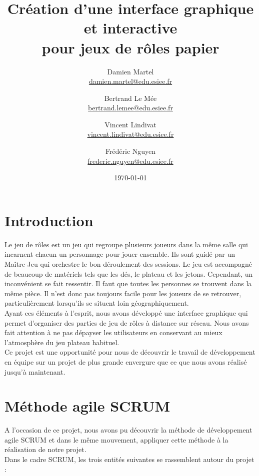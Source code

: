 \documentclass[11pt]{article}
\title{Création d'une interface graphique et interactive \\ pour jeux de rôles papier}
\author{
	Damien Martel \\ \href{mailto:damien.martel@edue.esiee.fr}{damien.martel@edu.esiee.fr} \and
	Bertrand Le Mée \\ \href{mailto:bertrand.lemee@edu.esiee.fr}{bertrand.lemee@edu.esiee.fr} \and
	Vincent Lindivat \\ \href{mailto:vincent.lindivat@edu.esiee.fr}{vincent.lindivat@edu.esiee.fr} \and
	Frédéric Nguyen \\ \href{mailto:frederic.nguyen@edu.esiee.fr}{frederic.nguyen@edu.esiee.fr}
}
\date{\today}
\begin{document}
\maketitle
\newpage
\hfill
\newpage
\tableofcontents
\newpage

\section{Introduction}

Le jeu de rôles est un jeu qui regroupe plusieurs joueurs dans la même salle qui incarnent chacun un personnage pour jouer ensemble. Ils sont guidé par un Maître Jeu qui orchestre le bon déroulement des sessions. Le jeu est accompagné de beaucoup de matériels tels que les dés, le plateau et les jetons. Cependant, un inconvénient se fait ressentir. Il faut que toutes les personnes se trouvent dans la même pièce. Il n'est donc pas toujours facile pour les joueurs de se retrouver, particulièrement lorsqu'ils se situent loin géographiquement. \\

Ayant ces éléments à l'esprit, nous avons développé une interface graphique qui permet d'organiser des parties de jeu de rôles à distance sur réseau. Nous avons fait attention à ne pas dépayser les utilisateurs en conservant au mieux l'atmosphère du jeu plateau habituel. \\

Ce projet est une opportunité pour nous de découvrir le travail de développement en équipe sur un projet de plus grande envergure que ce que nous avons réalisé jusqu'à maintenant.	

\section{Méthode agile SCRUM}

A l'occasion de ce projet, nous avons pu découvrir la méthode de développement
 agile SCRUM  et dans le même mouvement, appliquer cette méthode à la réalisation de notre projet.\\
 
Dans le cadre SCRUM, les trois entités suivantes se rassemblent autour du projet :
\end{document}

